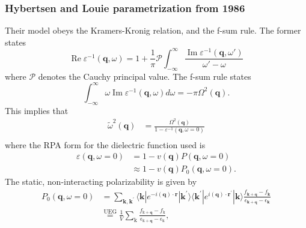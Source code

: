 \subsubsection{Hybertsen and Louie parametrization from 1986}
Their model obeys the Kramers-Kronig relation, and the f-sum rule. The former states
\begin{equation}
\operatorname{Re} \varepsilon^{-1}(\mathbf{q}, \omega) = 1 + \frac{1}{\pi} \mathcal{P} \int_{-\infty}^{\infty} \frac{\operatorname{Im} \varepsilon^{-1}(\mathbf{q}, \omega')}{\omega' - \omega}
\end{equation}
where $\mathcal{P}$ denotes the Cauchy principal value. The f-sum rule states
\begin{equation}
\int_{-\infty}^{\infty} \omega \operatorname{Im} \varepsilon^{-1}(\mathbf{q}, \omega) d\omega = -\pi \Omega^2(\mathbf{q}).
\end{equation}
This implies that
\begin{align}
\tilde{\omega}^2(\mathbf{q}) &= \frac{\Omega^2(\mathbf{q})}{1 - \varepsilon^{-1}(\mathbf{q},\omega=0)}\\
\end{align}
where the RPA form for the dielectric function used is
\begin{align}
\varepsilon(\mathbf{q}, \omega=0)&=1-v(\mathbf{q}) P(\mathbf{q}, \omega=0)\\
&\approx 1-v(\mathbf{q}) P_0(\mathbf{q}, \omega=0).
\end{align}
The static, non-interacting polarizability is given by
\begin{align}
P_0(\mathbf{q}, \omega=0)&=\sum_{\mathbf{k}, \mathbf{k}^{\prime} }\langle \mathbf{k}| e^{-i(\mathbf{q}) \cdot \mathbf{r}}|\mathbf{k}^{\prime} \rangle \langle \mathbf{k}^{\prime} |e^{i\left(\mathbf{q}\right) \cdot \mathbf{r}^{\prime}}|\mathbf{k}\rangle \frac{f_{\mathbf{k}+\mathbf{q}}-f_{\mathbf{k}}}{\epsilon_{\mathbf{k}+\mathbf{q}}-\epsilon_{\mathbf{k}}}\\
&\overset{\text{UEG}}{=} \frac{1}{V} \sum_{\mathrm{k}} \frac{f_{\mathrm{k}+\mathbf{q}}-f_{\mathrm{k}}}{\epsilon_{\mathrm{k}+\mathbf{q}}-\epsilon_{\mathrm{k}}},
\end{align}
